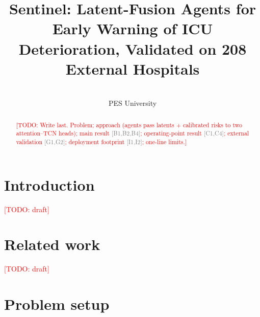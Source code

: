 \documentclass[11pt]{article}
\title{Sentinel: Latent-Fusion Agents for Early Warning of ICU Deterioration, Validated on 208 External Hospitals}
\author{\todo{author names and affiliations} \\ PES University}
\date{\todo{date}}
\newcommand{\todo}[1]{\textcolor{red}{[TODO: #1]}}
\newcommand{\ev}[1]{\textcolor{gray}{\scriptsize[#1]}}   %
\begin{document}
\maketitle

\begin{abstract}
\todo{Write last. Problem; approach (agents pass latents + calibrated risks to two
attention--TCN heads); main result \ev{B1,B2,B4}; operating-point result \ev{C1,C4};
external validation \ev{G1,G2}; deployment footprint \ev{I1,I2}; one-line limits.}
\end{abstract}

\section{Introduction}\label{sec:intro}
\todo{draft}

\section{Related work}\label{sec:related}
\todo{draft}

\section{Problem setup}\label{sec:setup}
\end{document}
